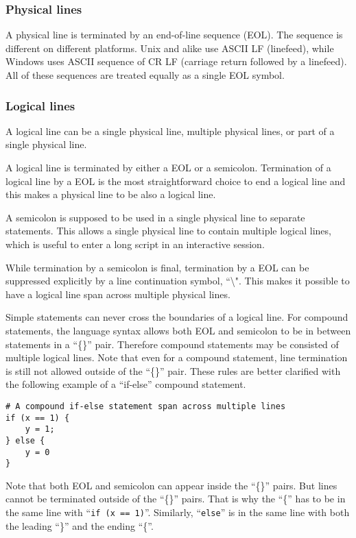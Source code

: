 \documentclass[10pt,a4paper]{article}
\begin{document}
\subsubsection{Physical lines}
A physical line is terminated by an end-of-line sequence (EOL). The
sequence is different on different platforms. Unix and alike use ASCII LF
(linefeed), while Windows uses ASCII sequence of CR LF (carriage return followed
by a linefeed). All of these sequences are treated equally as a single 
EOL symbol.

\subsubsection{Logical lines}
A logical line can be a single physical line, multiple physical lines, or
part of a single physical line.

A logical line is terminated by either a EOL or a semicolon.
Termination of a logical line by a EOL is the most 
straightforward choice to end a logical line and this makes a physical 
line to be also a logical line.

A semicolon is supposed to be used in a single physical line to separate 
statements. This allows a single physical line to contain multiple logical
lines, which is useful to enter a long script in an interactive session.

While termination by a semicolon is final, termination by a EOL can be 
suppressed explicitly by a line continuation symbol, ``\textbackslash".
This makes it possible to have a logical line span across multiple 
physical lines. 

Simple statements can never cross the boundaries of a logical line.
For compound statements, the language syntax allows both EOL and semicolon
to be in between statements in a ``\{\}'' pair. Therefore compound statements
may be consisted of multiple logical lines. Note that even for a compound 
statement, line termination is still not allowed outside of the 
``\{\}'' pair. 
These rules are better clarified with the following example of a ``if-else''
compound statement. 

\begin{lstlisting}
# A compound if-else statement span across multiple lines
if (x == 1) {
    y = 1;
} else {
    y = 0
}
\end{lstlisting}

Note that both EOL and semicolon can appear inside the ``\{\}'' pairs. 
But lines cannot be terminated outside of the ``\{\}'' pairs. That is
why the ``\{'' has to be in the same line with ``\lstinline$if (x == 1)$''.
Similarly, ``\lstinline$else$'' is in the same line with both the leading
``\}'' and the ending ``\{''.
\end{document}
